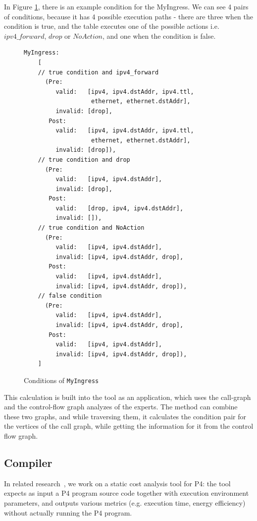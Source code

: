 \documentclass[sigconf]{acmart}
\begin{document}
  In Figure \ref{code:cond}, there is an example condition for the MyIngress. We can see 4 pairs of conditions, because it has 4 possible execution paths - there are three when the condition is true, and the table executes one of the possible actions i.e. $\mathit{ipv4\_forward}$, $\mathit{drop}$ or $\mathit{NoAction}$, and one when the condition is false.
  
  \begin{figure}
  	\begin{lstlisting}[language=cond]
  	MyIngress:
  	[
  	// true condition and ipv4_forward
  	  (Pre: 
  	     valid:   [ipv4, ipv4.dstAddr, ipv4.ttl,
  	               ethernet, ethernet.dstAddr],
  	     invalid: [drop],
  	   Post: 
  	     valid:   [ipv4, ipv4.dstAddr, ipv4.ttl,
  	               ethernet, ethernet.dstAddr],
  	     invalid: [drop]),
  	// true condition and drop
  	  (Pre: 
  	     valid:   [ipv4, ipv4.dstAddr],
  	     invalid: [drop],
  	   Post: 
  	     valid:   [drop, ipv4, ipv4.dstAddr],
  	     invalid: []),
  	// true condition and NoAction
  	  (Pre: 
  	     valid:   [ipv4, ipv4.dstAddr],
  	     invalid: [ipv4, ipv4.dstAddr, drop],
  	   Post: 
  	     valid:   [ipv4, ipv4.dstAddr],
  	     invalid: [ipv4, ipv4.dstAddr, drop]),
   	// false condition
   	  (Pre: 
   	     valid:   [ipv4, ipv4.dstAddr],
   	     invalid: [ipv4, ipv4.dstAddr, drop],
   	   Post: 
   	     valid:   [ipv4, ipv4.dstAddr],
   	     invalid: [ipv4, ipv4.dstAddr, drop]), 
   	]
  	\end{lstlisting}
  	\caption{Conditions of \texttt{MyIngress}}
  	\label{code:cond}
  \end{figure}
  
  This calculation is built into the tool as an application, which uses the call-graph and the control-flow graph analyzes of the experts. The method can combine these two graphs, and while traversing them, it calculates the condition pair for the vertices of the call graph, while getting the information for it from the control flow graph. 
  
  \subsection{Compiler} %
  In related research~\cite{cscs18,ocs20}, we work on a static cost analysis tool for P4: the tool expects as input a P4 program source code together with execution environment parameters, and outputs various metrics (e.g. execution time, energy efficiency) without actually running the P4 program.
\end{document}
